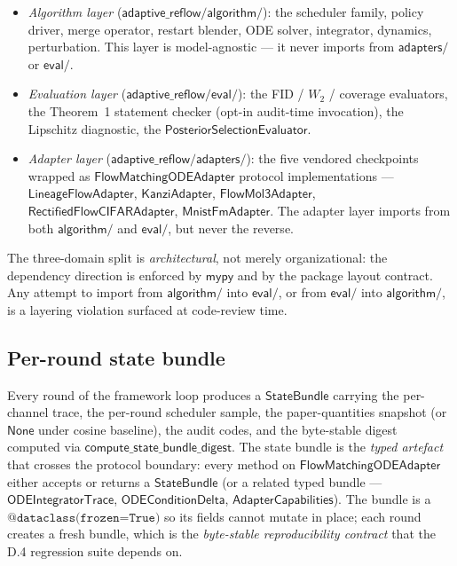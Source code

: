 \documentclass[journal,twocolumn,final]{IEEEtran}
\begin{document}
\begin{itemize}
\item \emph{Algorithm layer} ($\mathsf{adaptive\_reflow/algorithm/}$): the
scheduler family, policy driver, merge operator, restart blender, ODE solver,
integrator, dynamics, perturbation. This layer is model-agnostic --- it never
imports from $\mathsf{adapters/}$ or $\mathsf{eval/}$.
\item \emph{Evaluation layer} ($\mathsf{adaptive\_reflow/eval/}$): the FID /
$W_2$ / coverage evaluators, the Theorem~1 statement checker (opt-in
audit-time invocation), the Lipschitz diagnostic, the
$\mathsf{PosteriorSelectionEvaluator}$.
\item \emph{Adapter layer} ($\mathsf{adaptive\_reflow/adapters/}$): the five
vendored checkpoints wrapped as $\mathsf{FlowMatchingODEAdapter}$ protocol
implementations --- $\mathsf{LineageFlowAdapter}$, $\mathsf{KanziAdapter}$,
$\mathsf{FlowMol3Adapter}$, $\mathsf{RectifiedFlowCIFARAdapter}$,
$\mathsf{MnistFmAdapter}$. The adapter layer imports from both
$\mathsf{algorithm/}$ and $\mathsf{eval/}$, but never the reverse.
\end{itemize}

The three-domain split is \emph{architectural}, not merely organizational:
the dependency direction is enforced by $\mathsf{mypy}$ and by the package
layout contract. Any attempt to import from $\mathsf{algorithm/}$ into
$\mathsf{eval/}$, or from $\mathsf{eval/}$ into $\mathsf{algorithm/}$, is a
layering violation surfaced at code-review time.

\subsection{Per-round state bundle}

Every round of the framework loop produces a $\mathsf{StateBundle}$ carrying
the per-channel trace, the per-round scheduler sample, the paper-quantities
snapshot (or $\mathsf{None}$ under cosine baseline), the audit codes, and the
byte-stable digest computed via $\mathsf{compute\_state\_bundle\_digest}$. The
state bundle is the \emph{typed artefact} that crosses the protocol boundary:
every method on $\mathsf{FlowMatchingODEAdapter}$ either accepts or returns a
$\mathsf{StateBundle}$ (or a related typed bundle ---
$\mathsf{ODEIntegratorTrace}$, $\mathsf{ODEConditionDelta}$,
$\mathsf{AdapterCapabilities}$). The bundle is a
$\texttt{@dataclass(frozen=True)}$ so its fields cannot mutate in place; each
round creates a fresh bundle, which is the \emph{byte-stable reproducibility
contract} that the D.4 regression suite depends on.
\end{document}
